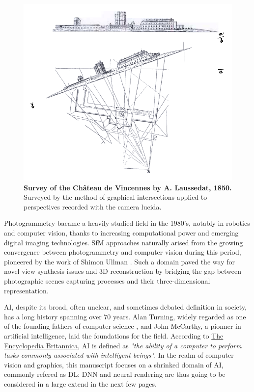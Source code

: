 \begin{figure}[htp!]
      \begin{center}
      \includegraphics[width=.5\textwidth]{images/introduction/laussedat_phtograpmetrie.png}
      \end{center}
      \caption{\textbf{Survey of the Château de Vincennes by A. Laussedat, 1850.} Surveyed by the method of graphical intersections applied to perspectives recorded with the camera lucida. }
      \label{fig:intro_laussedat}
\end{figure}

Photogrammetry bacame a heavily studied field in the 1980's, notably in robotics and computer vision, thanks to increasing computational power and emerging digital imaging technologies. \ac{SfM} approaches naturally arised from the growing convergence between photogrammetry and computer vision during this period, pioneered by the work of Shimon Ullman \citep{ullman1979interpretation}. Such a domain paved the way for novel view synthesis issues and 3D reconstruction by bridging the gap between photographic scenes capturing processes and their three-dimensional representation. 

\ac{AI}, despite its broad, often unclear, and sometimes debated definition in society, has a long history spanning over 70 years. Alan Turning, widely regarded as one of the founding fathers of computer science \citep{turing1950computing}, and John McCarthy, a pionner in artificial intelligence, laid the foundations for the field. According to \href{https://www.britannica.com/technology/artificial-intelligence}{The Encyclopedia Britannica}, \ac{AI} is defined as \textit{"the ability of a computer to perform tasks commonly associated with intelligent beings"}. In the realm of computer vision and graphics, this manuscript focuses on a shrinked domain of \ac{AI}, commonly refered as \ac{DL}: \ac{DNN} and neural rendering are thus going to be considered in a large extend in the next few pages.

